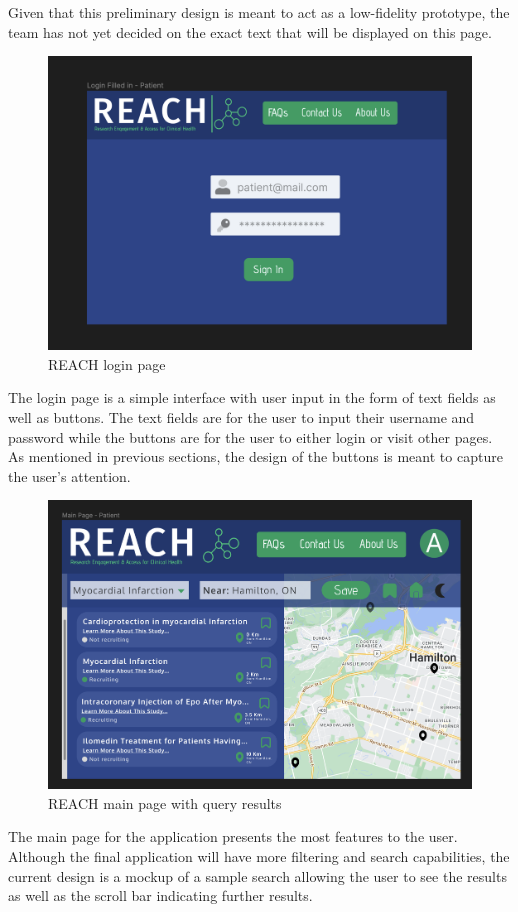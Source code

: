 \documentclass[12pt, titlepage]{article}
\begin{document}
Given that this preliminary design is meant to act as a low-fidelity prototype, 
the team has not yet decided on the exact text that will be displayed on this page. 


\begin{figure}[H]
  \centering
  \includegraphics[width=0.9\linewidth]{images/Login.png}
  \caption{REACH login page}
  \label{fig:figure2}
\end{figure}

The login page is a simple interface with user input in the form of text fields
 as well as buttons. The text fields are for the user to input their username and password
 while the buttons are for the user to either login or visit other pages.
 As mentioned in previous sections, the design
 of the buttons is meant to capture the user's attention.

\begin{figure}[H]
  \centering
  \includegraphics[width=0.9\linewidth]{images/MainPage.png}
  \caption{REACH main page with query results}
  \label{fig:figure3}
\end{figure}
The main page for the application presents the most features to the user. 
Although the final application will have more filtering
and search capabilities, the current design is a mockup of a sample search allowing the
 user to see the results as well as the scroll bar indicating further results. \newline
 
\end{document}
